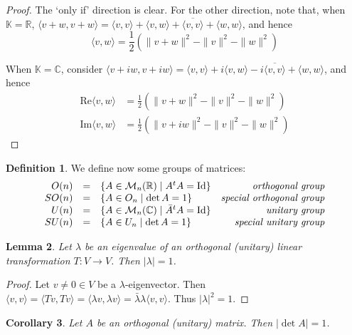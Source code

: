 \documentclass[10pt,fleqn]{article}
\newcommand{\id}{\mathrm{Id}}
\newcommand{\nRe}{\mathrm{Re}}
\newcommand{\nIm}{\mathrm{Im}}
\newcommand{\comps}{\mathbb{C}}
\newcommand{\reals}{\mathbb{R}}
\newcommand{\mat}{\mathcal{M}}
\theoremstyle{definition} \newtheorem{defn}{Definition}[section]
\theoremstyle{plain}      \newtheorem{thm}[defn]{Theorem}
\theoremstyle{plain}      \newtheorem{prop}[defn]{Proposition}
\theoremstyle{plain}      \newtheorem{lem}[defn]{Lemma}
\theoremstyle{plain}      \newtheorem{cor}[defn]{Corollary}
\theoremstyle{plain}      \newtheorem{ad}[defn]{Addendum}
\theoremstyle{definition} \newtheorem{ex}[defn]{Example}
\theoremstyle{definition} \newtheorem{rem}[defn]{Remark}
\numberwithin{equation}{subsection}
\begin{document}
\begin{proof}
    The `only if' direction is clear.
    For the other direction, note that, when $\mathbb{K}=\reals$,
    $
        \langle v+w,v+w\rangle=
        \langle v,v\rangle+\langle v,w\rangle+\overline{\langle v,v\rangle}+\langle w,w\rangle
    $,
    and hence
    \[
        \langle v,w\rangle=
        \frac{1}{2}(\|v+w\|^2-\|v\|^2-\|w\|^2)
    \]
    
    When $\mathbb{K}=\comps$, consider
    $
        \langle v+iw,v+iw\rangle=
        \langle v,v\rangle+i\langle v,w\rangle-i\overline{\langle v,v\rangle}+\langle w,w\rangle
    $,
    and hence
    \begin{align*}
        \nRe\langle v,w\rangle
        &=
        \frac{1}{2}(\|v+w\|^2-\|v\|^2-\|w\|^2)\\
        \nIm\langle v,w\rangle
        &=
        \frac{1}{2}(\|v+iw\|^2-\|v\|^2-\|w\|^2)
    \end{align*}
\end{proof}

\begin{defn}
    We define now some groups of matrices:
    \[
        \begin{array}{rclr}
        O(n)
        &=&
        \{A\in\mat_n(\reals)\mid A^tA=\id\}
        &\text{\emph{orthogonal group}}\\
        SO(n)
        &=&
        \{A\in O_n\mid \det A=1\}
        &\text{\emph{special orthogonal group}}\\
        U(n)
        &=&
        \{A\in\mat_n(\comps)\mid \bar{A}^tA=\id\}
        &\text{\emph{unitary group}}\\
        SU(n)
        &=&
        \{A\in U_n\mid \det A=1\}
        &\text{\emph{special unitary group}}
        \end{array}
    \]
\end{defn}

\begin{lem}
    Let $\lambda$ be an eigenvalue of an orthogonal (unitary) linear transformation $T:V\to V$.
    Then $|\lambda|=1$.
\end{lem}

\begin{proof}
    Let $v\neq0\in V$ be a $\lambda$-eigenvector.
    Then $\langle v,v\rangle=\langle Tv,Tv\rangle=\langle \lambda v,\lambda v\rangle=\bar{\lambda}\lambda\langle v,v\rangle$.
    Thus $|\lambda|^2=1$.
\end{proof}

\begin{cor}
    Let $A$ be an orthogonal (unitary) matrix.
    Then $|\det A|=1$.
\end{cor}
\end{document}
